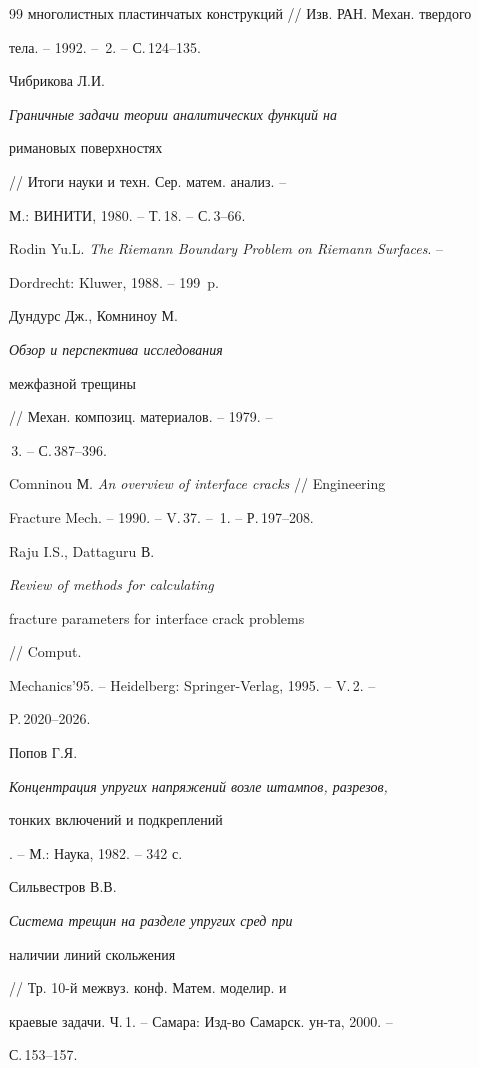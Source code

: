 \begin{thebibliography}{99}
{многолистных пластинчатых конструкций} // Изв. РАН. Механ. твердого 


тела. -- 1992. -- \No\,2. -- С.\,124--135. 




Чибрикова Л.И. {\em Граничные задачи теории аналитических функций на 


римановых поверхностях} // Итоги науки и техн. Сер. матем. анализ. -- 


М.: ВИНИТИ, 1980. -- Т.\,18. -- С.\,3--66. 




Rodin Yu.L. {\em The Riemann Boundary Problem on Riemann Surfaces}. --


Dordrecht: Kluwer, 1988. -- 199~p. 




Дундурс Дж., Комниноу М. {\em Обзор и перспектива исследования 


межфазной трещины} // Механ. композиц. материалов. -- 1979. -- 


\No\,3. -- С.\,387--396. 




Comninou М. {\em An overview of interface cracks} // Engineering 


Fracture Mech. -- 1990. -- V.\,37. -- \No\,1. -- Р.\,197--208. 




Raju I.S., Dattaguru В. {\em Review of methods for calculating 


fracture parameters for interface crack problems} // Comput. 


Mechanics'95. -- Heidelberg: Springer-Verlag, 1995. -- V.\,2. -- 


P.\,2020--2026. 




Попов Г.Я. {\em Концентрация упругих напряжений возле штампов, разрезов, 


тонких включений и подкреплений}. -- М.: Наука, 1982. -- 342 с. 




Сильвестров В.В. {\em Система трещин на разделе упругих сред при 


наличии линий скольжения} // Тр. 10-й межвуз. конф. Матем. моделир. и 


краевые задачи. Ч.\,1. -- Самара: Изд-во Самарск. ун-та, 2000. -- 


С.\,153--157. 





\end{thebibliography}
